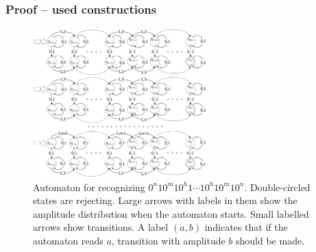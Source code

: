 \documentclass{beamer}
\begin{document}
\begin{frame}
\frametitle{Proof -- used constructions}
\small
\begin{figure}
\centering
\includegraphics[width=0.6\textwidth]{Img/1pfa.pdf}
\caption{Automaton for recognizing $0^n10^m10^h1 \cdots 10^h10^m10^n$. Double-circled states are rejecting. Large arrows with labels in them show the amplitude distribution when the automaton starts. Small labelled arrows show transitions. A label $(a, b)$ indicates that if the automaton reads $a$, transition with amplitude $b$ should be made.}
\label{fig:1pfa}
\end{figure}
\end{frame}
\end{document}

